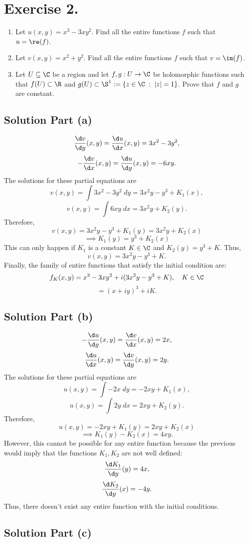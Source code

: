 \section*{Exercise 2.}

\begin{enumerate}[label=(\alph*)]
    \item Let $u(x,y) = x^3-3xy^2$. Find all the entire functions $f$ such that $u = \re(f)$.
    \item Let $v(x,y) = x^2 + y^2$. Find all the entire functions $f$ such that $v = \im(f)$.
    \item Let $U\subseteq \C$ be a region and let $f,g : U \to \C$ be holomorphic functions such that $f(U) \subset \R$ and $g(U) \subset \S^1 := \{z \in\C \;:\; |z| = 1\}$. Prove that $f$ and $g$ are constant. 
\end{enumerate}

\subsection*{Solution Part (a)}

\[ \frac{\d v}{\d y}(x,y) = \frac{\d u}{\d x}(x,y) = 3x^2-3y^2, \]
\[ -\frac{\d v}{\d x}(x,y) = \frac{\d u}{\d y}(x,y) = -6xy. \]
The solutions for these partial equations are
\[ v(x,y) = \int 3x^2-3y^2\; dy = 3x^2y-y^3 + K_1(x),\]
\[ v(x,y) = \int 6xy\; dx = 3x^2 y + K_2(y). \]
Therefore,
\[ v(x,y) = 3x^2y-y^3 + K_1(y) = 3x^2 y + K_2(x) \]
\[ \implies K_1(y) = y^3 + K_2(x) \]
This can only happen if $K_1$ is a constant $K \in \C$ and $K_2(y) = y^3 + K$. Thus,
\[ v(x,y) = 3x^2 y - y^3 + K. \]
Finally, the family of entire functions that satisfy the initial condition are:
\[ f_K(x,y) = x^3-3xy^2 + i(3x^2 y - y^3 + K),\hspace{1em} K\in \C \]
\[ = (x+iy)^3 + iK. \]

\subsection*{Solution Part (b)}

\[ -\frac{\d u}{\d y}(x,y) = \frac{\d v}{\d x}(x,y) = 2x, \]
\[ \frac{\d u}{\d x}(x,y) = \frac{\d v}{\d y}(x,y) = 2y. \]
The solutions for these partial equations are
\[ u(x,y) = \int -2x\; dy = -2xy + K_1(x),\]
\[ u(x,y) = \int 2y\; dx = 2xy + K_2(y). \]
Therefore,
\[ u(x,y) = -2xy + K_1(y) = 2xy + K_2(x) \]
\[ \implies K_1(y)-K_2(x) = 4xy. \]
However, this cannot be possible for any entire 
function because the previous would imply that the functions $K_1,K_2$ are not well defined:
\[ \frac{\d K_1}{\d y}(y) = 4x, \]
\[ \frac{\d K_2}{\d y}(x) = -4y. \]
Thus, there doesn't exist any entire function with the initial conditions.

\subsection*{Solution Part (c)}